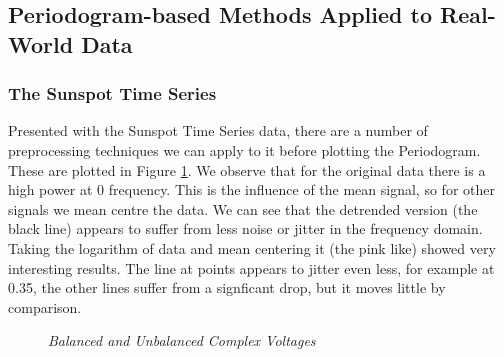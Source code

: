 \documentclass[./main.tex]{subfiles}
\begin{document}
\subsection{Periodogram-based Methods Applied to Real-World Data}

\subsubsection{The Sunspot Time Series}

Presented with the Sunspot Time Series data, there are a number of preprocessing techniques we can apply to it before plotting the Periodogram. These are plotted in Figure \ref{fig:1_4_a}. We observe that for the original data there is a high power at 0 frequency. This is the influence of the mean signal, so for other signals we mean centre the data. We can see that the detrended version (the black line) appears to suffer from less noise or jitter in the frequency domain. Taking the logarithm of data and mean centering it (the pink like) showed very interesting results. The line at points appears to jitter even less, for example at 0.35, the other lines suffer from a signficant drop, but it moves little by comparison.

\begin{figure}[h]
	\centering
	\resizebox{\textwidth}{!}{}
	\caption{\textit{Balanced and Unbalanced Complex Voltages}}
	\label{fig:1_4_a}
\end{figure}
\end{document}
